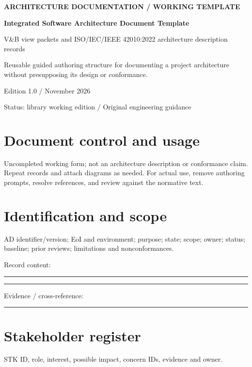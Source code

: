 \documentclass[11pt,letterpaper]{article}
\newcommand{\docsection}[1]{\Needspace{5\baselineskip}\section{#1}}
\begin{document}
\begin{titlepage}\thispagestyle{empty}\raggedright
\vspace*{0.65in}
{\sffamily\bfseries\color{teal} ARCHITECTURE DOCUMENTATION / WORKING TEMPLATE\par}
\vspace{0.35in}
{\sffamily\bfseries\color{navy}\Huge Integrated Software Architecture Document Template\par}
\vspace{0.2in}
{\sffamily\Large\color{muted} V\&B view packets and ISO/IEC/IEEE 42010:2022 architecture description records\par}
\vspace{0.35in}\noindent{\color{teal}\rule{\linewidth}{1.5pt}}\par
\vspace{0.3in}
Reusable guided authoring structure for documenting a project architecture without presupposing its design or conformance.

\vfill
{\sffamily\small Edition 1.0 \quad /  November 2026\par
Status: library working edition \quad / \quad Original engineering guidance\par}
\end{titlepage}
\tableofcontents\clearpage
\docsection{Document control and usage}
Uncompleted working form; not an architecture description or conformance claim. Repeat records and attach diagrams as needed. For actual use, remove authoring prompts, resolve references, and review against the normative text.

\docsection{Identification and scope}
AD identifier/version; EoI and environment; purpose; state; scope; owner; status; baseline; prior reviews; limitations and nonconformances.

Record content:

\noindent\rule{\linewidth}{0.35pt}\par\vspace{0.7em}
\noindent\rule{\linewidth}{0.35pt}\par\vspace{0.7em}
Evidence / cross-reference:

\noindent\rule{\linewidth}{0.35pt}\par
\docsection{Stakeholder register}
STK ID, role, interest, possible impact, concern IDs, evidence and owner.
\end{document}
